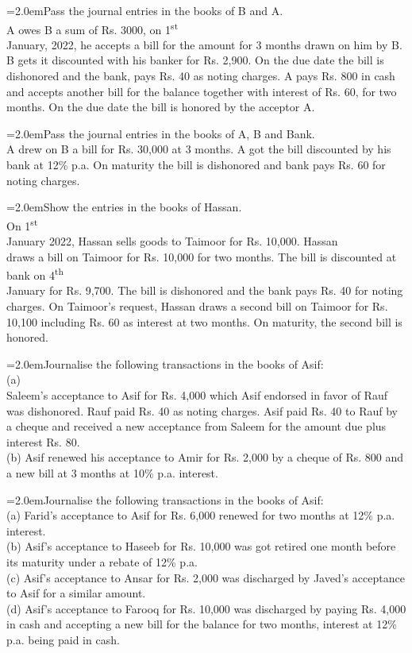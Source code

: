 \documentclass[11pt,a4paper]{article}
\newcommand{\lqn}[2]{\Needspace{6\baselineskip}\par\medskip\noindent\hangindent=2.0em\hangafter=1\makebox[2.0em][l]{\textbf{#1.}}#2\par}
\begin{document}
\lqn{41}{Pass the journal entries in the books of B and A.\\
A owes B a sum of Rs. 3000, on 1\textsuperscript{st}\\
January, 2022, he accepts a bill for the amount for 3 months drawn on him by B. B gets it discounted with his banker for Rs. 2,900. On the due date the bill is dishonored and the bank, pays Rs. 40 as noting charges. A pays Rs. 800 in cash and accepts another bill for the balance together with interest of Rs. 60, for two months. On the due date the bill is honored by the acceptor A.\par
}
\lqn{42}{Pass the journal entries in the books of A, B and Bank.\\
A drew on B a bill for Rs. 30,000 at 3 months. A got the bill discounted by his bank at 12\% p.a. On maturity the bill is dishonored and bank pays Rs. 60 for noting charges.\par
}
\lqn{43}{Show the entries in the books of Hassan.\\
On 1\textsuperscript{st}\\
January 2022, Hassan sells goods to Taimoor for Rs. 10,000. Hassan\\
draws a bill on Taimoor for Rs. 10,000 for two months. The bill is discounted at bank on 4\textsuperscript{th}\\
January for Rs. 9,700. The bill is dishonored and the bank pays Rs. 40 for noting charges. On Taimoor’s request, Hassan draws a second bill on Taimoor for Rs. 10,100 including Rs. 60 as interest at two months. On maturity, the second bill is honored.\par
}
\lqn{44}{Journalise the following transactions in the books of Asif:\\
(a) \\
Saleem’s acceptance to Asif for Rs. 4,000 which Asif endorsed in favor of Rauf was dishonored. Rauf paid Rs. 40 as noting charges. Asif paid Rs. 40 to Rauf by a cheque and received a new acceptance from Saleem for the amount due plus interest Rs. 80.\\
(b) Asif renewed his acceptance to Amir for Rs. 2,000 by a cheque of Rs. 800 and a new bill at 3 months at 10\% p.a. interest.\par
}
\lqn{45}{Journalise the following transactions in the books of Asif:\\
(a) Farid’s acceptance to Asif for Rs. 6,000 renewed for two months at 12\% p.a. interest.\\
(b) Asif’s acceptance to Haseeb for Rs. 10,000 was got retired one month before its maturity under a rebate of 12\% p.a.\\
(c) Asif’s acceptance to Ansar for Rs. 2,000 was discharged by Javed’s acceptance to Asif for a similar amount.\\
(d) Asif’s acceptance to Farooq for Rs. 10,000 was discharged by paying Rs. 4,000 in cash and accepting a new bill for the balance for two months, interest at 12\% p.a. being paid in cash.\par
}
\end{document}
